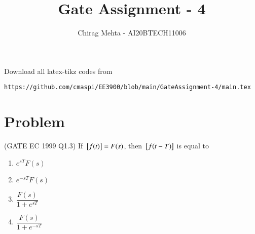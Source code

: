 \documentclass[journal,12pt,twocolumn]{IEEEtran}
\begin{document}
\makeatletter
{}
\makeatother
\let\StandardTheFigure\thefigure
\let\vec\mathbf
\renewcommand{\thefigure}{\theproblem}
\def\putbox#1#2#3{\makebox[0in][l]{\makebox[#1][l]{}\raisebox{\baselineskip}[0in][0in]{\raisebox{#2}[0in][0in]{#3}}}}
     \def\rightbox#1{\makebox[0in][r]{#1}}
     \def\centbox#1{\makebox[0in]{#1}}
     \def\topbox#1{\raisebox{-\baselineskip}[0in][0in]{#1}}
     \def\midbox#1{\raisebox{-0.5\baselineskip}[0in][0in]{#1}}
\vspace{3cm}
\title{Gate Assignment - 4}
\author{Chirag Mehta - AI20BTECH11006}
\maketitle
\newpage
\bigskip
\renewcommand{\thefigure}{\theenumi}
\renewcommand{\thetable}{\theenumi}
Download all 
latex-tikz codes from 
\begin{lstlisting}
https://github.com/cmaspi/EE3900/blob/main/GateAssignment-4/main.tex
\end{lstlisting}
\section{Problem}
(GATE EC 1999 Q1.3) If ${}\left[f(t)\right]=F(s)$, then ${}\left[f(t-T)\right]$ is equal to
\begin{enumerate}
    \item $e^{sT}F(s)$
    \item $e^{-sT}F(s)$
    \item $\dfrac{F(s)}{1+e^{sT}}$
    \item $\dfrac{F(s)}{1+e^{-sT}}$
\end{enumerate}
\end{document}
